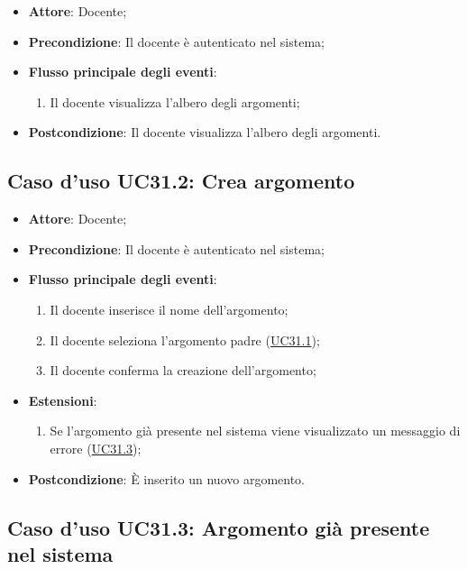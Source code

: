 \documentclass[12pt,a4paper]{article}
\begin{document}
\begin{itemize}

\item \textbf{Attore}: Docente; 
\item \textbf{Precondizione}: Il docente è autenticato nel sistema;

\item \textbf{Flusso principale degli eventi}:
\begin{enumerate}
	\item Il docente visualizza l'albero degli argomenti;
	
\end{enumerate}
\item \textbf{Postcondizione}: Il docente visualizza l'albero degli argomenti.
\end{itemize}
\hypertarget{UC31.2}{}
\subsection{Caso d'uso UC31.2: Crea argomento}

\begin{itemize}

\item \textbf{Attore}: Docente; 
\item \textbf{Precondizione}: Il docente è autenticato nel sistema;

\item \textbf{Flusso principale degli eventi}:
\begin{enumerate}
	\item Il docente inserisce il nome dell'argomento;
	\item Il docente seleziona l'argomento padre (\hyperlink{UC31.1}{UC31.1});
	\item Il docente conferma la creazione dell'argomento;
	
\end{enumerate}
\item \textbf{Estensioni}:
\begin{enumerate}
	\item Se l'argomento già presente nel sistema viene visualizzato un messaggio di errore (\hyperlink{UC31.3}{UC31.3});
	
\end{enumerate}
\item \textbf{Postcondizione}: È inserito un nuovo argomento.
\end{itemize}
\hypertarget{UC31.3}{}
\subsection{Caso d'uso UC31.3: Argomento già presente nel sistema}
\end{document}
